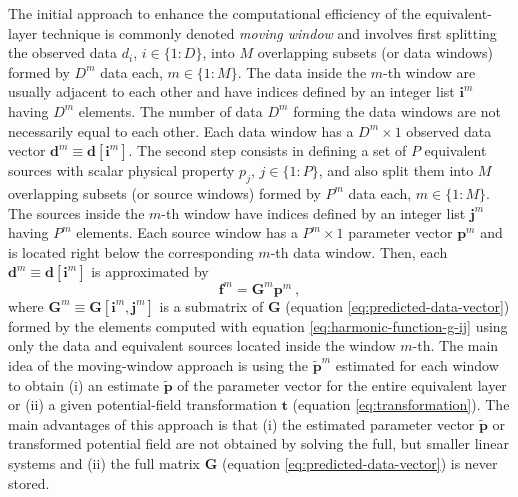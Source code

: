 The initial approach to enhance the computational efficiency of the equivalent-layer technique 
is commonly denoted \textit{moving window} and involves
first splitting the observed data $d_{i}$, $i \in \{1 : D\}$, into $M$ overlapping subsets (or data windows) 
formed by $D^{m}$ data each, $m \in \{ 1 : M \}$.
The data inside the $m$-th window are usually adjacent to each other and have indices defined by an 
integer list $\mathbf{i}^{m}$ having $D^{m}$ elements.
The number of data $D^{m}$ forming the data windows are not necessarily equal to each other.
Each data window has a $D^{m} \times 1$ observed data vector $\mathbf{d}^{m} \equiv \mathbf{d}[\mathbf{i}^{m}]$.
The second step consists in defining a set of $P$ equivalent sources with scalar physical property $p_{j}$, $j \in \{1:P\}$,
and also split them into $M$ overlapping subsets (or source windows) formed by $P^{m}$ data each, $m \in \{ 1 : M \}$.
The sources inside the $m$-th window have indices defined by an integer list $\mathbf{j}^{m}$ having $P^{m}$ elements.
Each source window has a $P^{m} \times 1$ parameter vector $\mathbf{p}^{m}$ and
is located right below the corresponding $m$-th data window. 
Then, each $\mathbf{d}^{m} \equiv \mathbf{d}[\mathbf{i}^{m}]$ is approximated by 
\begin{equation}
	\mathbf{f}^{m} = \mathbf{G}^{m} \mathbf{p}^{m} \: ,
	\label{eq:predicted-data-window-m}
\end{equation}
where $\mathbf{G}^{m} \equiv \mathbf{G}[\mathbf{i}^{m}, \mathbf{j}^{m}]$ is a submatrix of 
$\mathbf{G}$ (equation \ref{eq:predicted-data-vector}) formed by the elements computed with equation 
\ref{eq:harmonic-function-g-ij} using only the data and equivalent sources located inside the window $m$-th.
The main idea of the moving-window approach is using the $\tilde{\mathbf{p}}^{m}$ estimated for 
each window to obtain (i) an estimate $\tilde{\mathbf{p}}$ of the parameter vector for the entire equivalent layer
or (ii) a given potential-field transformation $\mathbf{t}$ (equation \ref{eq:transformation}).
The main advantages of this approach is that (i) the estimated parameter vector $\tilde{\mathbf{p}}$ or transformed potential field
are not obtained by solving the full, but smaller linear systems and (ii) the full matrix $\mathbf{G}$ (equation \ref{eq:predicted-data-vector})
is never stored.

